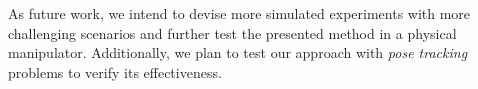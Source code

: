\documentclass[conference]{IEEEtran}
\begin{document}
As future work, we intend to devise more simulated experiments with more challenging
scenarios and further test the presented method in a physical manipulator. Additionally,
we plan to test  our approach with \emph{pose tracking} problems to verify its effectiveness.

\end{document}
